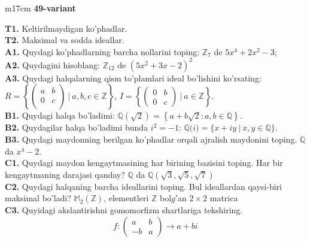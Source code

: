 \documentclass{article}
\begin{document}
\begin{tabular}{m{17cm}}
\textbf{49-variant}
\newline

\textbf{T1.} Keltirilmaydigan ko'phadlar. \\
\textbf{T2.} Maksimal va sodda ideallar. \\
\textbf{A1.} Quydagi ko'phadlarning barcha nollarini toping:
\(\mathbb{Z}_{7}\) de \(5x^{4} + 2x^{2} - 3\); \\
\textbf{A2.} Quydagini hisoblang:
\(\mathbb{Z}_{12}\) de \(\left( 5x^{2} + 3x - 2 \right)^{2}\) \\
\textbf{A3.} Quydagi halqalarning qism to'plamlari ideal bo'lishini ko'rsating: \(R = \left\{ \begin{pmatrix}
a & b \\
0 & c \\
 & 
\end{pmatrix}\ |\ a,b,c \in \mathbb{Z} \right\}\), \(I = \left\{ \begin{pmatrix}
0 & b \\
0 & c
\end{pmatrix}\ |\ a \in \mathbb{Z} \right\}\). \\
\textbf{B1.} Quydagi halqa bo'ladimi:
\(\mathbb{Q}\left( \sqrt{2} \right) = \left\{ a + b\sqrt{2}:a,b \in \mathbb{Q} \right\}\). \\
\textbf{B2.} Quydagilar halqa bo'ladimi bunda \(i^{2} = - 1\):
\(\mathbb{Q(}i) = \{ x + iy\ |\ x,y \in \mathbb{Q\}}\). \\
\textbf{B3.} Quydagi maydonning berilgan ko'phadlar orqali ajralish maydonini toping.
\(\mathbb{Q}\) da \(x^{4} - 2\). \\
\textbf{C1.} Quydagi maydon kengaytmasining har birining bazisini toping. Har bir kengaytmaning darajasi qanday?
\(\mathbb{Q}\) da \(\mathbb{Q}\left( \sqrt{3},\sqrt{5},\sqrt{7} \right)\) \\
\textbf{C2.} Quydagi halqaning barcha ideallarini toping. Bul ideallardan qaysi-biri maksimal bo'ladi?
\(\mathbb{M}_{2}\left( \mathbb{Z} \right)\), elementleri \(\mathbb{Z}\) bol\(g'\)an \(2 \times 2\) matrica \\
\textbf{C3.} Quyidagi akslantirishni gomomorfizm shartlariga tekshiring.
\[f:\begin{pmatrix}
a & b \\
 - b & a
\end{pmatrix} \rightarrow a + bi\] \\

\end{tabular}
\vspace{1cm}
\end{document}
